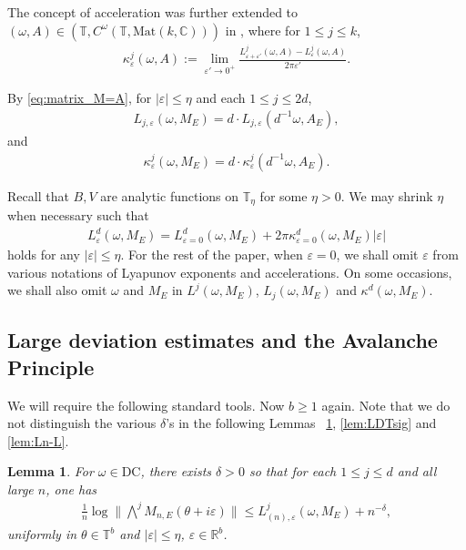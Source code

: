 \documentclass[11pt]{amsart}
\newtheorem{lemma}[theorem]{Lemma}
\newcommand{\R}{\mathbb R}
\newcommand{\C}{\mathbb C}
\newcommand{\T}{\mathbb T}
\def\tor{\mathbb{T}}
\begin{document}
The concept of acceleration was further extended to  $(\omega,A)\in (\T,C^{\omega}(\T, \mathrm{Mat}(k,\C)))$ in \cite{AJS}, where for $1\leq j\leq k$,
\begin{align}
    \kappa^j_{\varepsilon}(\omega,A):=\lim_{\varepsilon'\to 0^+} \frac{L^j_{\varepsilon+\varepsilon'}(\omega, A)-L^j_{\varepsilon}(\omega, A)}{2\pi \varepsilon'}.
\end{align}



By \eqref{eq:matrix_M=A}, for $|\varepsilon|\leq \eta$ and each $1\leq j\leq 2d$,
\begin{align}\label{eq:M=A}
    L_{j,\varepsilon}(\omega,M_E)=d\cdot L_{j,\varepsilon}(d^{-1}\omega,A_E),
\end{align}
and
\begin{align}\label{eq:kappa_M=dA}
\kappa^j_{\varepsilon}(\omega,M_E)=d\cdot \kappa^j_{\varepsilon}(d^{-1}\omega,A_E).
\end{align}


Recall that $B,V$ are analytic functions on $\T_{\eta}$ for some $\eta>0$.  We may shrink $\eta$ when necessary such that 
\begin{align}\label{eq:L_linear}
L^d_{\varepsilon}(\omega,M_E)=L^d_{\varepsilon=0}(\omega,M_E)+2\pi \kappa^d_{\varepsilon=0}(\omega,M_E)|\varepsilon|
\end{align}
holds for any $|\varepsilon|\leq \eta$. 
For the rest of the paper, when $\varepsilon=0$, we shall omit $\varepsilon$ from various notations of Lyapunov exponents and accelerations.
On some occasions, we shall also omit $\omega$ and $M_E$ in $L^j(\omega,M_E)$, $L_j(\omega,M_E)$ and $\kappa^d(\omega,M_E)$.

\subsection{Large deviation estimates and the Avalanche Principle}


We will require the following standard tools. 
Now $b\ge1$ again.
Note that we do not distinguish the various $\delta$'s in the following Lemmas~ \ref{lem:upperbd}, \ref{lem:LDTsig} and \ref{lem:Ln-L}.
\begin{lemma}\label{lem:upperbd}
For $\omega\in \mathrm{DC}$,
there exists $\delta>0$ so that for each $1\leq j\leq d$ and all large $n$, one has 
\begin{align}
\frac{1}{n} \log \big \|\textstyle{\bigwedge^j} M_{n,E}(\theta+i\varepsilon)\big\|\leq {L}^{j}_{(n),\varepsilon}(\omega,M_E)+ n^{-\delta},
\end{align}
uniformly in $\theta\in \tor^b$ and $|\varepsilon|\leq \eta$, $\varepsilon\in\R^b$. 
\end{lemma}
\end{document}
